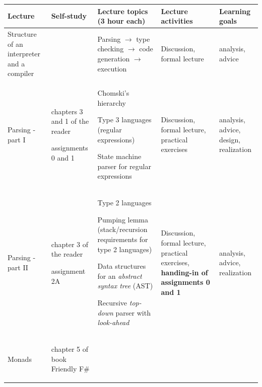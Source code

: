 \documentclass[a4paper, 10pt]{article}
\begin{document}
{\small
	\begin{tabular}{ | p{2.5cm} | p{2.5cm} | p{5cm} | p{2.5cm} | p{2.5cm} | }
		\hline
		\textbf{Lecture} & \textbf{Self-study} & \textbf{Lecture topics (3 hour each)} & \textbf{Lecture activities} & \textbf{Learning goals}\\
		\hline
		Structure of an interpreter and a compiler & & 				
			Parsing $\rightarrow$ type checking $\rightarrow$ code generation $\rightarrow$ execution
			& Discussion, formal lecture & analysis, advice \\
		\hline
		Parsing - part I & 
				\begin{inparaenum}
					\item chapters 3 and 1 of the reader
					\item assignments 0 and 1
				\end{inparaenum} & 
				\begin{inparaenum}
					\item Chomski's hierarchy
					\item Type 3 languages (regular expressions)
					\item State machine parser for regular expressions
				\end{inparaenum}
			& Discussion, formal lecture, practical exercises & analysis, advice, design, realization \\
		\hline
		Parsing - part II & 
				\begin{inparaenum}
					\item chapter 3 of the reader
					\item assignment 2A
				\end{inparaenum} & 		
				\begin{inparaenum}
					\item Type 2 languages
					\item Pumping lemma (stack/recursion requirements for type 2 languages)
					\item Data structures for an \textit{abstract syntax tree} (AST)
					\item Recursive \textit{top-down} parser with \textit{look-ahead}
				\end{inparaenum}
			& Discussion, formal lecture, practical exercises, \textbf{handing-in of assignments 0 and 1} & analysis, advice, realization \\
		\hline
		Monads &
				\begin{inparaenum}
					\item chapter 5 of book Friendly F\#

\end{inparaenum}
\end{tabular}}
\end{document}
